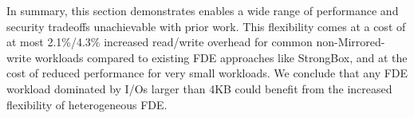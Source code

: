 In summary, this section demonstrates \sys enables a wide range of performance
and security tradeoffs unachievable with prior work. This flexibility comes at a
cost of at most 2.1\%/4.3\% increased read/write overhead for common
non-Mirrored-write workloads compared to existing FDE approaches like StrongBox,
and at the cost of reduced performance for very small workloads. We conclude
that any FDE workload dominated by I/Os larger than 4KB could benefit from the
increased flexibility of heterogeneous FDE.
